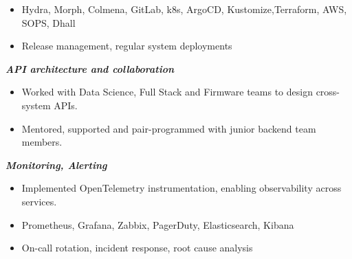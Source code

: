 \documentclass[11pt,a4paper,ngerman,sans]{moderncv}
\begin{document}
{\begin{itemize}
    \item Hydra, Morph, Colmena, GitLab, k8s, ArgoCD, Kustomize,\newline Terraform, AWS,
          SOPS, Dhall
    \item Release management, regular system deployments
    \\
  \end{itemize}
	\textbf{\emph{API architecture and collaboration}}
  \begin{itemize}
    \item Worked with Data Science, Full Stack and Firmware teams to design cross-system APIs.
    \item Mentored, supported and pair-programmed with junior backend team members.
    \\
  \end{itemize}
	\textbf{\emph{Monitoring, Alerting}}
  \begin{itemize}
    \item Implemented OpenTelemetry instrumentation, enabling observability across services.
    \item Prometheus, Grafana, Zabbix, PagerDuty, Elasticsearch, Kibana
    \item On-call rotation, incident response, root cause analysis
    \\
  \end{itemize}
}
\end{document}
